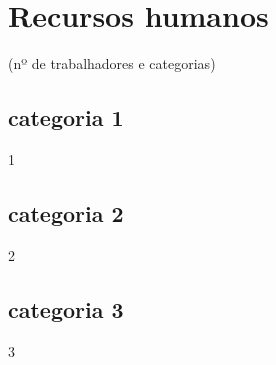 \section{Recursos humanos} \label{section: Recursos humanos}
(nº de trabalhadores e categorias)
\subsection{categoria 1}
1
\subsection{categoria 2}
2
\subsection{categoria 3}
3
